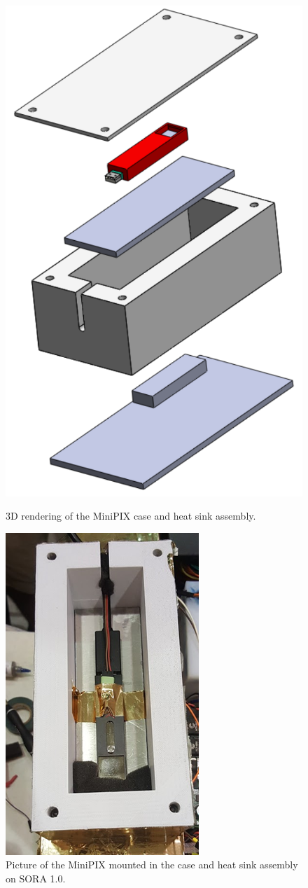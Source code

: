 \begin{figure}[]
  \begin{minipage}[c]{0.49\linewidth}
    \includegraphics[scale=1, width=.5\textwidth]{Figures/Minipix_case_assembly.pdf}
    \caption{3D rendering of the MiniPIX case and heat sink assembly.} %
    \label{fig:case_assem}
  \end{minipage}
  \hfill
  \begin{minipage}[c]{0.49\linewidth}
    \centering
    \includegraphics[scale=1, width=.5\textwidth]{Figures/minipix_mounted.png}
    \caption{Picture of the MiniPIX mounted in the case and heat sink assembly on SORA 1.0.} %
    \label{fig:case_assem_pic}
  \end{minipage}
\end{figure}

